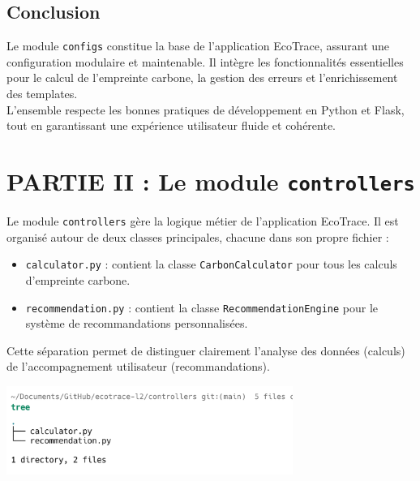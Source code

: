 \documentclass[a4paper,11pt]{article}
\begin{document}
        \subsection{Conclusion}
            \begin{tcolorbox}[colback=lightgray!6, colframe=black, left=2mm, right=5mm, top=2mm, bottom=0mm, boxrule=0.1mm]
                Le module \texttt{configs} constitue la base de l'application EcoTrace, assurant une configuration modulaire et maintenable. Il intègre les fonctionnalités essentielles pour le calcul de l'empreinte carbone, la gestion des erreurs et l'enrichissement des templates.\\

                L'ensemble respecte les bonnes pratiques de développement en Python et Flask, tout en garantissant une expérience utilisateur fluide et cohérente.
            \end{tcolorbox}

    \newpage
    \section{PARTIE II : Le module \texttt{controllers}}
        \noindent Le module \texttt{controllers} gère la logique métier de l'application EcoTrace. Il est organisé autour de deux classes principales, chacune dans son propre fichier :

        \begin{itemize}
            \item \texttt{calculator.py} : contient la classe \texttt{CarbonCalculator} pour tous les calculs d'empreinte carbone.
            \item \texttt{recommendation.py} : contient la classe \texttt{RecommendationEngine} pour le système de recommandations personnalisées.
        \end{itemize}

        \noindent Cette séparation permet de distinguer clairement l'analyse des données (calculs) de l'accompagnement utilisateur (recommandations).

        \begin{center}
            \includegraphics[width=0.7\textwidth]{captures/controllers/img1.png}
        \end{center}
\end{document}
